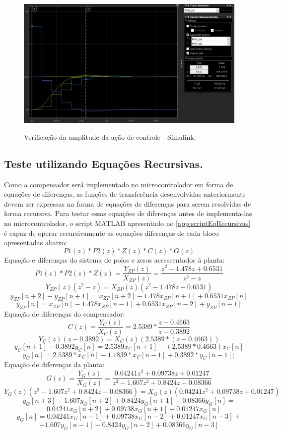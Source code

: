 \documentclass[
	article,			%
	11pt,				%
	oneside,			%
	a4paper,			%
	english,			%
	brazil,				%
	sumario=tradicional
	]{abntex2}
\begin{document}
\begin{figure}[htb!]
	\centering
	\caption{Verificação da amplitude da ação de controle - Simulink.}
	\includegraphics[scale=0.4]{./img/step_CtrlActionSimulink.JPG}
	\label{fig:step_CtrlActionSimulink}
\end{figure}

\pagebreak

\subsection{Teste utilizando Equações Recursivas.}

Como a compensador será implementado no microcontrolador em forma de equações de diferenças, as funções de transferência desenvolvidas anteriormente devem ser expressas na forma de equações de diferenças para serem resolvidas de forma recursiva.
Para testar essas equações de diferenças antes de implementa-las no microcontrolador, o script MATLAB apresentado no \autoref{app:scriptEqRecursivas} é capaz de operar recursivamente as equações diferenças de cada bloco apresentadas abaixo:
$$P1(z)*P2(z)*Z(z)*C(z)*G(z)$$
Equação e diferenças do sistema de polos e zeros acrescentados á planta:
$$P1(z)*P2(z)*Z(z) = \frac{Y_{ZP}(z)}{X_{ZP}(z)} = \frac{z^2 - 1.478 z + 0.6531}{z^2-z}$$
$$Y_{ZP}(z)(z^2-z) = X_{ZP}(z)(z^2 - 1.478 z + 0.6531)$$
$$y_{ZP}[n+2]-y_{ZP}[n+1] = x_{ZP}[n+2] - 1.478x_{ZP}[n+1] + 0.6531x_{ZP}[n]$$
$$y_{ZP}[n] = x_{ZP}[n] - 1.478x_{ZP}[n-1] + 0.6531x_{ZP}[n-2]+y_{ZP}[n-1]$$
Equação de diferenças do compensador:
$$C(z) = \frac{Y_{C}(z)}{X_{C}(z)} = 2.5389 * \frac{z - 0.4663}{z - 0.3892}$$ 
$$Y_{C}(z)(z - 0.3892) = X_{C}(z)(2.5389*(z - 0.4663))$$
$$y_{C}[n+1] - 0.3892y_{C}[n] = 2.5389x_{C}[n+1]-(2.5389*0.4663)x_{C}[n]$$
$$y_C[n] =  2.5389*x_C[n] - 1.1839*x_C[n-1] + 0.3892*y_C[n-1];$$
Equação de diferenças da planta:
$$G(z) = \frac{Y_{G}(z)}{X_{G}(z)} = \frac{0.04241z^2 + 0.09738z + 0.01247}{z^3 - 1.607z^2 + 0.8424z - 0.08366}$$
$$Y_{G}(z)(z^3 - 1.607z^2 + 0.8424z - 0.08366) = X_{G}(z)(0.04241z^2 + 0.09738z + 0.01247)$$
$$y_{G}[n+3] - 1.607y_{G}[n+2] + 0.8424y_{G}[n+1] - 0.08366y_{G}[n] =$$ 
$$=0.04241x_{G}[n+2] + 0.09738x_{G}[n+1]  + 0.01247x_{G}[n] $$
$$y_{G}[n] = 0.04241x_{G}[n-1] + 0.09738x_{G}[n-2]  + 0.01247x_{G}[n-3] +$$ 
$$+1.607y_{G}[n-1] - 0.8424y_{G}[n-2] + 0.08366y_{G}[n-3]  $$
\end{document}
